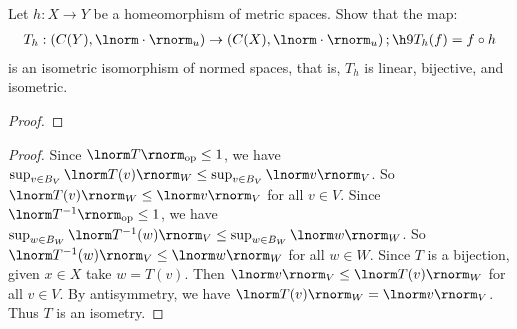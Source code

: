 \documentclass[11pt,twoside,openany]{memoir}
\begin{document}
    \begin{exercise}
        Let $h:X \rightarrow Y$ be a homeomorphism of metric spaces. Show that the map:
            \begin{equation*}
            \begin{split}
                T_h: \left( C(Y), \lnorm \cdot \rnorm_u \right) \rightarrow \left( C(X), \lnorm \cdot \rnorm_u \right); \h9 T_h(f) = f \circ h
            \end{split}
            \end{equation*}
        is an isometric isomorphism of normed spaces, that is, $T_h$ is linear, bijective, and isometric.
    \end{exercise}
        {\color{red} \begin{proof}
            
        \end{proof}}
    \begin{exercise}
        
    \end{exercise}
        {\color{red} \begin{proof}
            Since $\lnorm T \rnorm_\text{op} \leq 1$, we have $\sup_{v \in B_V} \lnorm T(v) \rnorm_W \leq \sup_{v \in B_V}\lnorm v \rnorm_V$. So $\lnorm T(v) \rnorm_W \leq \lnorm v \rnorm_V$ for all $v \in V$. Since $\lnorm T^{-1} \rnorm_\text{op} \leq 1$, we have $\sup_{w \in B_W} \lnorm T^{-1}(w) \rnorm_V \leq \sup_{w \in B_W}\lnorm w \rnorm_W$. So $\lnorm T^{-1}(w) \rnorm_V \leq \lnorm w \rnorm_W$ for all $w \in W$. Since $T$ is a bijection, given $x \in X$ take $w = T(v)$. Then $\lnorm v \rnorm_V \leq \lnorm T(v) \rnorm_W$ for all $v \in V$. By antisymmetry, we have $\lnorm T(v) \rnorm_W = \lnorm v \rnorm_V$. Thus $T$ is an isometry.
        \end{proof}}
\end{document}
